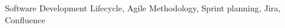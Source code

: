 \skillcategory{}{}
 Software Development Lifecycle, Agile Methodology, Sprint planning, Jira, Confluence\\